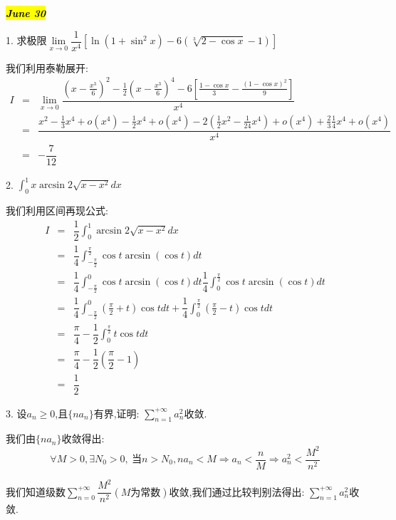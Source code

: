 \hl{\textbf{\textit{June 30}}}

1. 求极限$\lim\limits_{x\rightarrow 0}\dfrac{1}{x^4}\left[ \ln(1+\sin^2 x)-6(\sqrt[3]{2-\cos x}-1)\right] $
\begin{solution}
	
	我们利用泰勒展开: 
	\begin{eqnarray*}
		I&=&\lim\limits_{x\rightarrow 0}\dfrac{(x-\frac{x^3}{6})^2-\frac{1}{2}(x-\frac{x^3}{6})^4-6[\frac{1-\cos x}{3}-\frac{(1-\cos x)^2}{9}]}{x^4}\\
		&=&\dfrac{x^2-\frac{1}{3}x^4+o(x^4)-\frac{1}{2}x^4+o(x^4)-2(\frac{1}{2}x^2-\frac{1}{24}x^4)+o(x^4)+\frac{2}{3}\frac{1}{4}x^4+o(x^4)}{x^4}\\
		&=&-\dfrac{7}{12}
	\end{eqnarray*}
	
\end{solution}

2. $\int_{0}^{1}x\arcsin 2\sqrt{x-x^2}dx$
\begin{solution}
	
	我们利用区间再现公式: 
	\begin{eqnarray*}
		I&=&\dfrac{1}{2}\int_{0}^{1}\arcsin2\sqrt{x-x^2}dx\\
		&=&\dfrac{1}{4}\int_{-\frac{\pi}{2}}^{\frac{\pi}{2}}\cos t\arcsin (\cos t)dt\\
		&=&\dfrac{1}{4}\int_{-\frac{\pi}{2}}^{0}\cos t\arcsin (\cos t)dt\dfrac{1}{4}\int_{0}^{\frac{\pi}{2}}\cos t\arcsin (\cos t)dt\\
		&=&\dfrac{1}{4}\int_{-\frac{\pi}{2}}^{0}(\frac{\pi}{2}+t)\cos tdt+\dfrac{1}{4}\int_{0}^{\frac{\pi}{2}}(\frac{\pi}{2}-t)\cos tdt\\
		&=&\dfrac{\pi}{4}-\dfrac{1}{2}\int_{0}^{\frac{\pi}{2}}t\cos tdt\\
		&=&\dfrac{\pi}{4}-\dfrac{1}{2}(\dfrac{\pi}{2}-1)\\
		&=&\dfrac{1}{2}
	\end{eqnarray*}
	
	
\end{solution}

3. 设$a_{n}\geq 0$,且$\{na_{n}\}$有界,证明: $\sum\limits_{n=1}^{+\infty}a_{n}^2$收敛.
\begin{solution}
	
	我们由$\{na_{n}\}$收敛得出: 
	$$\forall M>0, \exists N_{0}>0,\ \text{当}n>N_{0}, na_{n}<M\Rightarrow a_{n}<\dfrac{n}{M}\Rightarrow a_{n}^2<\dfrac{M^2}{n^2} $$
	
	我们知道级数$\sum\limits_{n=0}^{+\infty}\dfrac{M^2}{n^2}(M\text{为常数})$收敛,我们通过比较判别法得出: $\sum\limits_{n=1}^{+\infty}a_{n}^2$收敛.
\end{solution}

